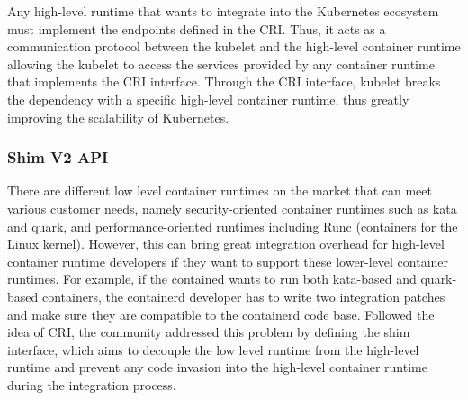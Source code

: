 Any high-level runtime that wants to integrate into the Kubernetes ecosystem must implement the endpoints defined in the CRI. Thus, it acts as a communication protocol between the kubelet and the 
high-level container runtime allowing the kubelet to access the services provided by any container runtime that implements the CRI interface. Through the CRI interface,  kubelet breaks the dependency with a specific 
high-level container runtime, thus greatly improving the scalability of Kubernetes.

\subsubsection{Shim V2 API}
There are different low level container runtimes on the market that can meet various customer needs, namely security-oriented container runtimes such as kata and quark, and performance-oriented runtimes including Runc (containers for the Linux kernel). 
However, this can bring great integration overhead for high-level container runtime developers if they want to support these lower-level container runtimes. For example, if the contained wants to run both kata-based and quark-based containers, 
the containerd developer has to write two integration patches and make sure they are compatible to the containerd code base. Followed the idea of CRI, the community addressed this problem by defining the shim interface, which aims to 
decouple the low level runtime from the high-level runtime and prevent any code invasion into the high-level container runtime during the integration process.
